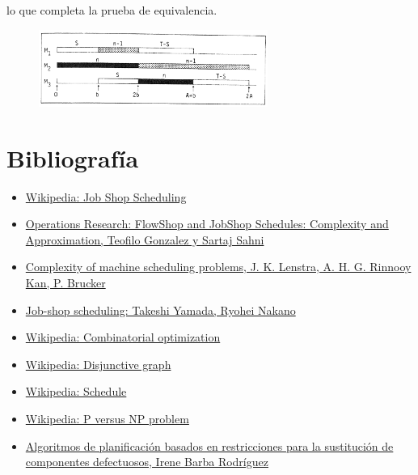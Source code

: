 \documentclass[11pt, a4paper,spanish]{article}
\begin{document}
					lo que completa la prueba de equivalencia.
					
					\begin{figure}[H]
						\centering
						\includegraphics[width=75mm]{res/example2.png}
					\end{figure}

	\newpage

		\section{Bibliografía}

			\begin{itemize}
			
				\item \href{https://en.wikipedia.org/wiki/Job_shop_scheduling}{Wikipedia: Job Shop Scheduling}
				\item \href{http://www.rspq.org/pubs/gonz.pdf}{Operations Research: FlowShop and JobShop Schedules: Complexity and Approximation, Teofilo Gonzalez y Sartaj Sahni}
				\item \href{http://oai.cwi.nl/oai/asset/18051/18051A.pdf}{Complexity of machine scheduling problems, J. K. Lenstra, A. H. G. Rinnooy Kan, P. Brucker}
				\item \href{http://www.kecl.ntt.co.jp/as/members/yamada/galbk.pdf}{Job-shop scheduling: Takeshi Yamada, Ryohei Nakano}
				\item \href{https://en.wikipedia.org/wiki/Combinatorial_optimization}{Wikipedia: Combinatorial optimization}
				\item \href{https://en.wikipedia.org/wiki/Disjunctive_graph}{Wikipedia: Disjunctive graph}
				\item \href{https://en.wikipedia.org/wiki/Schedule_(computer_science)}{Wikipedia: Schedule}
				\item \href{https://en.wikipedia.org/wiki/P_versus_NP_problem}{Wikipedia: P versus NP problem}
				\item \href{https://www.lsi.us.es/docs/doctorado/memorias/MemoInvestigIreneBarba.pdf}{Algoritmos de planificación basados en restricciones para la sustitución de componentes defectuosos, Irene Barba Rodríguez}

			\end{itemize}
\end{document}
